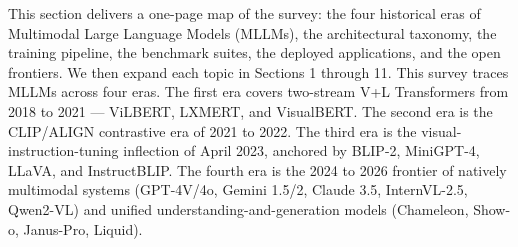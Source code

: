 This section delivers a one-page map of the survey: the four historical eras of Multimodal Large Language Models (MLLMs), the architectural taxonomy, the training pipeline, the benchmark suites, the deployed applications, and the open frontiers. We then expand each topic in Sections 1 through 11. This survey traces MLLMs across four eras. The first era covers two-stream V+L Transformers from 2018 to 2021 --- ViLBERT, LXMERT, and VisualBERT. The second era is the CLIP/ALIGN contrastive era of 2021 to 2022. The third era is the visual-instruction-tuning inflection of April 2023, anchored by BLIP-2, MiniGPT-4, LLaVA, and InstructBLIP. The fourth era is the 2024 to 2026 frontier of natively multimodal systems (GPT-4V/4o, Gemini 1.5/2, Claude 3.5, InternVL-2.5, Qwen2-VL) and unified understanding-and-generation models (Chameleon, Show-o, Janus-Pro, Liquid).
